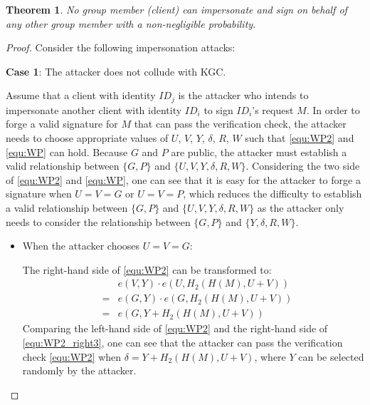 \documentclass[letterpaper,12pt]{article}
\newtheorem{theorem}{Theorem}
\begin{document}
\begin{theorem}\label{sec:sec:theorem:No_Group_member}
No group member (client) can impersonate and sign on behalf of any other group member with a non-negligible probability.
\end{theorem}
\begin{proof} Consider the following impersonation attacks:

\textbf{Case 1}: The attacker does not collude with KGC.

Assume that a client with identity $ID_j$ is the attacker who intends to impersonate another client with identity $ID_i$ to sign $ID_i$'s request $M$. In order to forge a valid signature for $M$ that can pass the verification check, the attacker needs to choose appropriate values of $U$, $V$, $Y$, $\delta$, $R$, $W$ such that  \eqref{equ:WP2} and \eqref{equ:WP} can hold. Because $G$ and $P$ are public, the attacker must establish a valid relationship between $\{G, P\}$ and $\{U, V, Y, \delta, R, W\}$. Considering the two side of  \eqref{equ:WP2} and \eqref{equ:WP}, one can see that it is easy for the attacker to forge a signature when $U=V=G$ or $U=V=P$, which reduces the difficulty to establish a valid relationship between $\{G, P\}$ and $\{U, V, Y, \delta, R, W\}$ as the attacker only needs to consider the relationship between $\{G, P\}$ and $\{Y, \delta, R, W\}$.
\begin{itemize}
\item When the attacker chooses $U=V=G$:

The right-hand side of \eqref{equ:WP2} can be transformed to:
\begin{eqnarray} \label{equ:WP2_right3}
&&e(V, Y)\cdot e(U, H_2(H(M), U+V)) \nonumber\\
&=&e(G, Y)\cdot e(G, H_2(H(M),U+V)) \nonumber\\
&=&e(G, Y+H_2(H(M), U+V))
\end{eqnarray}
Comparing the left-hand side of \eqref{equ:WP2} and the right-hand side of \eqref{equ:WP2_right3}, one can see that the attacker can pass the verification check \eqref{equ:WP2} when  $\delta=Y+H_2(H(M), U+V)$, where $Y$ can be selected randomly by the attacker.


\end{itemize}
\end{proof}
\end{document}
